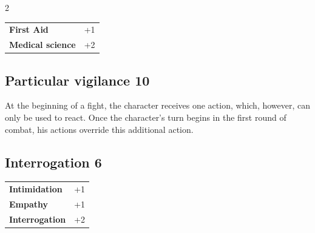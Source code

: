 \begin{multicols}{2}
\begin{tcolorbox}
\begin{tabular}{@{}ll@{}}
    \textbf{First Aid} & +1\\
    \textbf{Medical science} & +2\\
\end{tabular}


\end{tcolorbox}

\begin{tcolorbox}
    \subsection*{Particular vigilance \hfill \small{10 }}
    \tcblower
At the beginning of a fight, the character receives one action, which, however, can only be used to react. Once the character's turn begins in the first round of combat, his actions override this additional action.


\vspace{3mm}



\end{tcolorbox}

\begin{tcolorbox}
    \subsection*{Interrogation \hfill \small{6 }}
    \tcblower




\begin{tabular}{@{}ll@{}}
    \textbf{Intimidation} & +1\\
    \textbf{Empathy} & +1\\
    \textbf{Interrogation} & +2\\
\end{tabular}


\end{tcolorbox}

\begin{tcolorbox}

\end{tcolorbox}
\end{multicols}
